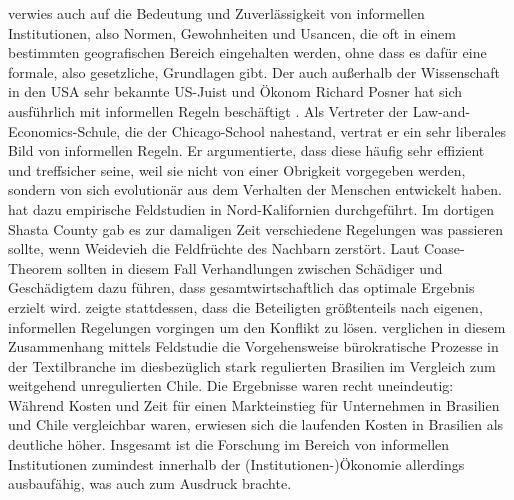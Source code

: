 \textcite[S. 43]{North1990} verwies auch auf die Bedeutung und Zuverlässigkeit von informellen Institutionen, also Normen, Gewohnheiten und Usancen, die oft in einem bestimmten geografischen Bereich eingehalten werden, ohne dass es dafür eine formale, also gesetzliche, Grundlagen gibt. Der auch außerhalb der Wissenschaft in den USA sehr bekannte US-Juist und Ökonom Richard Posner hat sich ausführlich mit informellen Regeln beschäftigt \parencite{Posner1983}. Als Vertreter der Law-and-Economics-Schule, die der Chicago-School nahestand, vertrat er ein sehr liberales Bild von informellen Regeln. Er argumentierte, dass diese häufig sehr effizient und treffsicher seine, weil sie nicht von einer Obrigkeit vorgegeben werden, sondern von sich evolutionär aus dem Verhalten der Menschen entwickelt haben. \textcite{Ellickson1991, Ellickson1994} hat dazu empirische Feldstudien in Nord-Kalifornien durchgeführt. Im dortigen Shasta County gab es zur damaligen Zeit verschiedene Regelungen was passieren sollte, wenn Weidevieh die Feldfrüchte des Nachbarn zerstört. Laut Coase-Theorem sollten in diesem Fall Verhandlungen zwischen Schädiger und Geschädigtem dazu führen, dass gesamtwirtschaftlich das optimale Ergebnis erzielt wird. \textcite{Ellickson1991} zeigte stattdessen, dass die Beteiligten größtenteils nach eigenen, informellen Regelungen vorgingen um den Konflikt zu lösen. \textcite{Stone1996} verglichen in diesem Zusammenhang mittels Feldstudie die Vorgehensweise bürokratische Prozesse in der Textilbranche im diesbezüglich stark regulierten Brasilien im Vergleich zum weitgehend unregulierten Chile. Die Ergebnisse waren recht uneindeutig: Während Kosten und Zeit für einen Markteinstieg für Unternehmen in Brasilien und Chile vergleichbar waren, erwiesen sich die laufenden Kosten in Brasilien als deutliche höher. Insgesamt ist die Forschung im Bereich von informellen Institutionen zumindest innerhalb der (Institutionen-)Ökonomie allerdings ausbaufähig, was \textcite{North1990} auch zum Ausdruck brachte.

